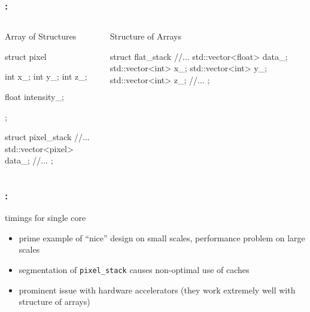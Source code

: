 \documentclass[9pt,xcolor=table]{beamer}
\begin{document}
\begin{frame}[fragile]
  \frametitle{\insertsectionhead{}: \insertsubsectionhead{}}
  \begin{columns}[t]
    \begin{column}{.45\textwidth}
      \begin{block}{Array of Structures}
        \begin{pyglist}[language=c++,numbers=left,style=emacs]
        struct pixel {
      
        int x_;
        int y_;
        int z_;
      
        float intensity_;
      
      };
      
        struct pixel_stack {
        //...
        std::vector<pixel> data_;
        //...
      };
      \end{pyglist}
      \end{block}
    \end{column}
    \pause
    \begin{column}{.45\textwidth}
      \begin{block}{Structure of Arrays}
        \begin{pyglist}[language=c++,numbers=left,style=emacs]
      
        struct flat_stack   {
        //...
        std::vector<float> data_;
        std::vector<int> x_;
        std::vector<int> y_;
        std::vector<int> z_;
        //...
      };
      \end{pyglist}
      \end{block}
    \end{column}
  \end{columns}
\end{frame}

\begin{frame}
\frametitle{\insertsectionhead{}: \insertsubsectionhead{}}
\begin{center}
  \huge timings for single core
\end{center}
\begin{itemize}
\item prime example of ``nice'' design on small scales, performance problem on large scales
\item segmentation of \texttt{pixel\_stack} causes non-optimal use of caches
\item prominent issue with hardware accelerators (they work extremely well with structure of arrays)
\end{itemize}
\end{frame}
\end{document}
